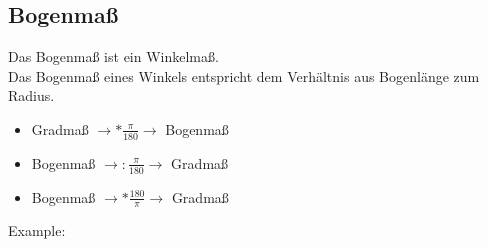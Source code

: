 \newpage
\subsection{Bogenmaß}

Das Bogenmaß ist ein Winkelmaß.\\
Das Bogenmaß eines Winkels entspricht dem Verhältnis aus Bogenlänge zum Radius.

\hfill \break
\begin{itemize}
    \item Gradmaß $ \rightarrow * \frac{\pi}{180} \rightarrow $ Bogenmaß
    \item Bogenmaß $ \rightarrow : \frac{\pi}{180} \rightarrow $ Gradmaß
    \item Bogenmaß $ \rightarrow * \frac{180}{\pi} \rightarrow $ Gradmaß
\end{itemize}


\hfill \break
Example:\\
\fboxrule=0.8pt 